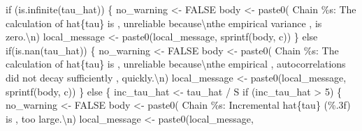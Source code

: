 \documentclass[
  letterpaper,
  DIV=11,
  numbers=noendperiod]{scrartcl}
\newenvironment{Shaded}{\begin{snugshade}}{\end{snugshade}}
\newcommand{\CharTok}[1]{\textcolor[rgb]{0.13,0.47,0.30}{#1}}
\newcommand{\ControlFlowTok}[1]{\textcolor[rgb]{0.00,0.23,0.31}{#1}}
\newcommand{\DecValTok}[1]{\textcolor[rgb]{0.68,0.00,0.00}{#1}}
\newcommand{\KeywordTok}[1]{\textcolor[rgb]{0.00,0.23,0.31}{#1}}
\newcommand{\NormalTok}[1]{\textcolor[rgb]{0.00,0.23,0.31}{#1}}
\newcommand{\OperatorTok}[1]{\textcolor[rgb]{0.37,0.37,0.37}{#1}}
\newcommand{\SpecialCharTok}[1]{\textcolor[rgb]{0.37,0.37,0.37}{#1}}
\newcommand{\StringTok}[1]{\textcolor[rgb]{0.13,0.47,0.30}{#1}}
\begin{document}
\begin{Shaded}
\begin{Highlighting}[]
    \ControlFlowTok{if}\NormalTok{ (}\KeywordTok{is}\NormalTok{.infinite(tau\_hat)) \{}
\NormalTok{      no\_warning }\OperatorTok{\textless{}{-}}\NormalTok{ FALSE}
\NormalTok{      body }\OperatorTok{\textless{}{-}}\NormalTok{ paste0(}\StringTok{\textquotesingle{}  Chain }\SpecialCharTok{\%s}\StringTok{: The calculation of hat}\SpecialCharTok{\{tau\}}\StringTok{ is \textquotesingle{}}\NormalTok{,}
                     \StringTok{\textquotesingle{}unreliable because}\CharTok{\textbackslash{}n}\StringTok{the empirical variance \textquotesingle{}}\NormalTok{,}
                     \StringTok{\textquotesingle{}is zero.}\CharTok{\textbackslash{}n}\StringTok{\textquotesingle{}}\NormalTok{)}
\NormalTok{      local\_message }\OperatorTok{\textless{}{-}}\NormalTok{ paste0(local\_message, sprintf(body, c))}
\NormalTok{    \} }\ControlFlowTok{else} \ControlFlowTok{if}\NormalTok{(}\KeywordTok{is}\NormalTok{.nan(tau\_hat)) \{}
\NormalTok{      no\_warning }\OperatorTok{\textless{}{-}}\NormalTok{ FALSE}
\NormalTok{      body }\OperatorTok{\textless{}{-}}\NormalTok{ paste0(}\StringTok{\textquotesingle{}  Chain }\SpecialCharTok{\%s}\StringTok{: The calculation of hat}\SpecialCharTok{\{tau\}}\StringTok{ is \textquotesingle{}}\NormalTok{,}
                     \StringTok{\textquotesingle{}unreliable because}\CharTok{\textbackslash{}n}\StringTok{the empirical \textquotesingle{}}\NormalTok{,}
                     \StringTok{\textquotesingle{}autocorrelations did not decay sufficiently \textquotesingle{}}\NormalTok{,}
                     \StringTok{\textquotesingle{}quickly.}\CharTok{\textbackslash{}n}\StringTok{\textquotesingle{}}\NormalTok{)}
\NormalTok{      local\_message }\OperatorTok{\textless{}{-}}\NormalTok{ paste0(local\_message, sprintf(body, c))}
\NormalTok{    \} }\ControlFlowTok{else}\NormalTok{ \{}
\NormalTok{      inc\_tau\_hat }\OperatorTok{\textless{}{-}}\NormalTok{ tau\_hat }\OperatorTok{/}\NormalTok{ S}
      \ControlFlowTok{if}\NormalTok{ (inc\_tau\_hat }\OperatorTok{\textgreater{}} \DecValTok{5}\NormalTok{) \{}
\NormalTok{        no\_warning }\OperatorTok{\textless{}{-}}\NormalTok{ FALSE}
\NormalTok{        body }\OperatorTok{\textless{}{-}}\NormalTok{ paste0(}\StringTok{\textquotesingle{}  Chain }\SpecialCharTok{\%s}\StringTok{: Incremental hat}\SpecialCharTok{\{tau\}}\StringTok{ (}\SpecialCharTok{\%.3f}\StringTok{) is \textquotesingle{}}\NormalTok{,}
                       \StringTok{\textquotesingle{}too large.}\CharTok{\textbackslash{}n}\StringTok{\textquotesingle{}}\NormalTok{)}
\NormalTok{        local\_message }\OperatorTok{\textless{}{-}}\NormalTok{ paste0(local\_message,}

\end{Highlighting}
\end{Shaded}
\end{document}
